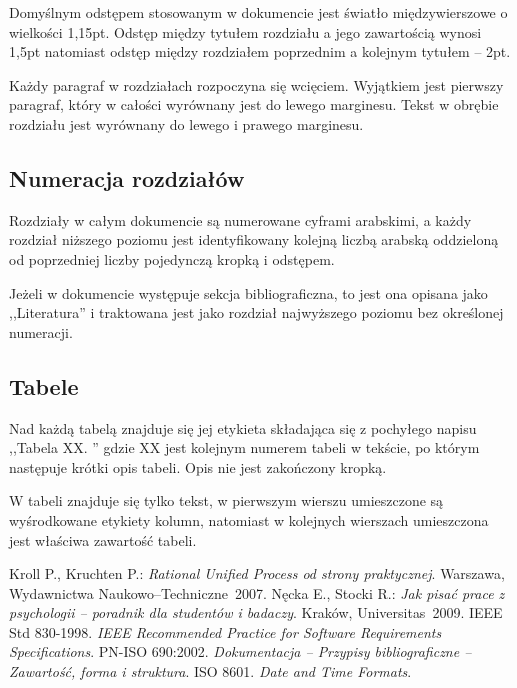 \documentclass [11pt, a4paper, leqno]	{article}	%
\begin{document}
Domyślnym odstępem stosowanym w dokumencie jest światło międzywierszowe o wielkości 1,15pt. Odstęp między tytułem rozdziału a jego zawartością wynosi 1,5pt natomiast odstęp między rozdziałem poprzednim a kolejnym tytułem -- 2pt.
	
Każdy paragraf w rozdziałach rozpoczyna się wcięciem. Wyjątkiem jest pierwszy paragraf, który w całości wyrównany jest do lewego marginesu.  Tekst w obrębie rozdziału jest wyrównany do lewego i prawego marginesu.

\subsection{Numeracja rozdziałów}
\noindent
Rozdziały w całym dokumencie są numerowane cyframi arabskimi, a każdy rozdział niższego poziomu jest identyfikowany kolejną liczbą arabską oddzieloną od poprzedniej liczby pojedynczą kropką i odstępem. 

Jeżeli w dokumencie występuje sekcja bibliograficzna, to jest ona opisana jako ,,Literatura'' i traktowana jest jako rozdział najwyższego poziomu bez określonej numeracji. 

\subsection{Tabele}
\noindent
Nad każdą tabelą znajduje się jej etykieta składająca się z pochyłego napisu ,,Tabela XX. '' gdzie XX jest kolejnym numerem tabeli w tekście, po którym następuje krótki opis tabeli. Opis nie jest zakończony kropką. 

W tabeli znajduje się tylko tekst, w pierwszym wierszu umieszczone są wyśrodkowane etykiety kolumn, natomiast w kolejnych wierszach umieszczona jest właściwa zawartość tabeli. 

\newpage
{}
\begin{thebibliography}{2}
	 Kroll P., Kruchten P.: \emph{Rational Unified Process od strony praktycznej}. Warszawa, Wydawnictwa Naukowo--Techniczne~2007.
	 Nęcka E., Stocki R.: \emph{Jak pisać prace z psychologii -- poradnik dla studentów i badaczy}. Kraków, Universitas~2009.
	 IEEE Std 830-1998. \emph{IEEE Recommended Practice for Software Requirements Specifications}.
	 PN-ISO 690:2002. \emph{Dokumentacja – Przypisy bibliograficzne – Zawartość, forma i struktura}.
	 ISO 8601. \emph{Date and Time Formats}.
\end{thebibliography}
\end{document}
